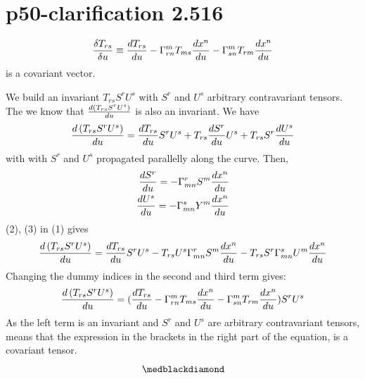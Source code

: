 \section{p50-clarification 2.516}
\begin{tcolorbox}
$$\frac{\delta T_{rs}}{\delta u} \equiv \dv{T_{rs}}{u}  - \Gamma^m_{rn}T_{ms}\dv{x^n}{u} - \Gamma^m_{sn}T_{rm}\dv{x^n}{u}$$ is a covariant vector.
\end{tcolorbox}
We build an invariant $ T_{rs} S^rU^s$ with $S^r$ and $U^s$ arbitrary contravariant tensors. The we know that $\dv{\left( T_{rs} S^r U^s\right)}{u}$ is also an invariant. We have 
\begin{align}
\dv{\left( T_{rs} S^r U^s\right)}{u} = \dv{T_{rs}}{u} S^r U^s + T_{rs} \dv{S^r}{u} U^s + T_{rs} S^r \dv{U^s}{u}
\end{align} 
with with $S^r$ and $U^s$ propagated parallelly along the curve. Then,
\begin{align}
\dv{S^r}{u} = - \Gamma^r_{mn}S^m\dv{x^n}{u}\\
\dv{U^s}{u} = - \Gamma^s_{mn}Y^m\dv{x^n}{u}
\end{align} 
(2), (3) in (1) gives 
\begin{align}
\dv{\left( T_{rs} S^r U^s\right)}{u} = \dv{T_{rs}}{u} S^r U^s - T_{rs}U^s\Gamma^r_{mn}S^m\dv{x^n}{u} - T_{rs} S^r \Gamma^s_{mn}U^m\dv{x^n}{u}
\end{align} 
Changing the dummy indices in the second and third term gives:
\begin{align}
\dv{\left( T_{rs} S^r U^s\right)}{u} = (\dv{T_{rs}}{u}  - \Gamma^m_{rn}T_{ms}\dv{x^n}{u} - \Gamma^m_{sn}T_{rm}\dv{x^n}{u})S^r U^s
\end{align} 
As the left term is an invariant and $S^r$ and $U^s$ are arbitrary contravariant tensors, means that the expression in the brackets in the right part of the equation, is a covariant tensor.
$$\medblackdiamond$$
\newpage

